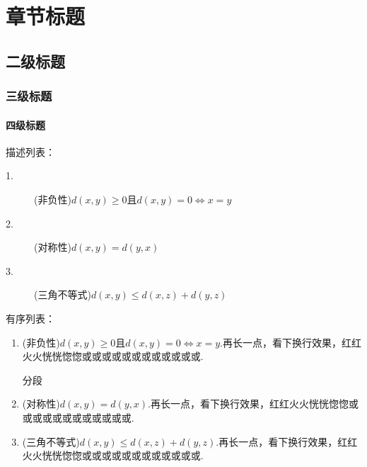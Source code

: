 \chapter{章节标题}
\section{二级标题}
\subsection{三级标题}
\subsubsection{四级标题}

描述列表：
\begin{description}
    \item[1.] (非负性)$d(x,y)\geqslant 0$且$d(x,y)=0\Leftrightarrow x=y$
    \item[2.] (对称性)$d(x,y)=d(y,x)$
    \item[3.] (三角不等式)$d(x,y)\leqslant d(x,z)+d(y,z)$
\end{description}

有序列表：
\begin{enumerate}
    \item (非负性)$d(x,y)\geqslant 0$且$d(x,y)=0\Leftrightarrow x=y$.再长一点，看下换行效果，红红火火恍恍惚惚或或或或或或或或或或或或.
    
          分段
    \item (对称性)$d(x,y)=d(y,x)$.再长一点，看下换行效果，红红火火恍恍惚惚或或或或或或或或或或或或.
    \item (三角不等式)$d(x,y)\leqslant d(x,z)+d(y,z)$.再长一点，看下换行效果，红红火火恍恍惚惚或或或或或或或或或或或或.
\end{enumerate}

